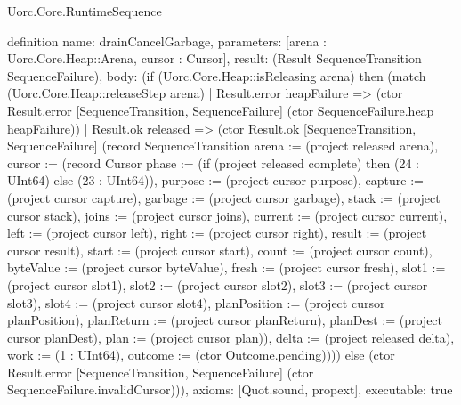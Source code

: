 \begin{lexlean}{Uorc.Core.RuntimeSequence}
\begin{semanticmodule}
definition{
  name: drainCancelGarbage,
  parameters: [arena : Uorc.Core.Heap::Arena, cursor : Cursor],
  result: (Result SequenceTransition SequenceFailure),
  body: (if (Uorc.Core.Heap::isReleasing arena) then (match (Uorc.Core.Heap::releaseStep arena)
    | Result.error heapFailure => (ctor Result.error [SequenceTransition, SequenceFailure] (ctor SequenceFailure.heap heapFailure))
    | Result.ok released => (ctor Result.ok [SequenceTransition, SequenceFailure] (record SequenceTransition {arena := (project released arena), cursor := (record Cursor {phase := (if (project released complete) then (24 : UInt64) else (23 : UInt64)), purpose := (project cursor purpose), capture := (project cursor capture), garbage := (project cursor garbage), stack := (project cursor stack), joins := (project cursor joins), current := (project cursor current), left := (project cursor left), right := (project cursor right), result := (project cursor result), start := (project cursor start), count := (project cursor count), byteValue := (project cursor byteValue), fresh := (project cursor fresh), slot1 := (project cursor slot1), slot2 := (project cursor slot2), slot3 := (project cursor slot3), slot4 := (project cursor slot4), planPosition := (project cursor planPosition), planReturn := (project cursor planReturn), planDest := (project cursor planDest), plan := (project cursor plan)}), delta := (project released delta), work := (1 : UInt64), outcome := (ctor Outcome.pending)}))) else (ctor Result.error [SequenceTransition, SequenceFailure] (ctor SequenceFailure.invalidCursor))),
  axioms: [Quot.sound, propext],
  executable: true
}


\end{semanticmodule}
\end{lexlean}
